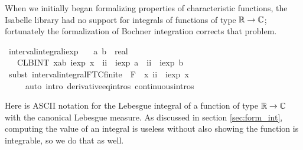 \documentclass{article}
\theoremstyle{definition}
\begin{document}
\medskip

When we initially began formalizing properties of characteristic functions, the Isabelle library had no support for integrals of functions of type $\mathbb{R} \rightarrow \mathbb{C}$; fortunately the formalization of Bochner integration corrects that problem.

\medskip

\begin{isabellebody}
\isamarkupfalse%
\ interval{\isacharunderscore}integral{\isacharunderscore}iexp{\isacharcolon}\isanewline
\ \ \ a\ b\ {\isacharcolon}{\isacharcolon}\ real\isanewline
\ \ \ {\isachardoublequoteopen}{\isacharparenleft}CLBINT\ x{\isacharequal}a{\isachardot}{\isachardot}b{\isachardot}\ iexp\ x{\isacharparenright}\ {\isacharequal}\ ii\ {\isacharasterisk}\ iexp\ a\ {\isacharminus}\ ii\ {\isacharasterisk}\ iexp\ b{\isachardoublequoteclose}\isanewline
{}\isamarkupfalse%
\ {\isacharparenleft}subst\ interval{\isacharunderscore}integral{\isacharunderscore}FTC{\isacharunderscore}finite\ {\isacharbrackleft}\ F\ {\isacharequal}\ {\isachardoublequoteopen}{\isasymlambda}x{\isachardot}\ {\isacharminus}ii\ {\isacharasterisk}\ iexp\ x{\isachardoublequoteclose}{\isacharbrackright}{\isacharparenright}\isanewline
\ \ \ \ \ {\isacharparenleft}auto\ intro{\isacharbang}{\isacharcolon}\ derivative{\isacharunderscore}eq{\isacharunderscore}intros\ continuous{\isacharunderscore}intros{\isacharparenright}%
\end{isabellebody}

\medskip

Here  is ASCII notation for the Lebesgue integral of a function of type $\mathbb{R} \rightarrow \mathbb{C}$ with the canonical Lebesgue measure. As discussed in section \ref{sec:form_int}, computing the value of an integral is useless without also showing the function is integrable, so we do that as well.

\medskip
\end{document}
